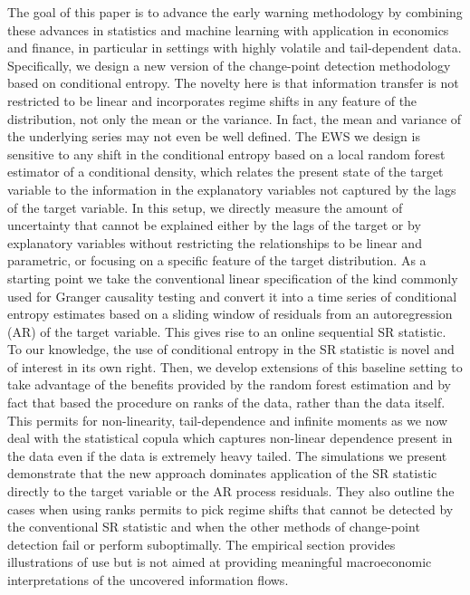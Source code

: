 The goal of this paper is to advance the early warning methodology by combining these advances in statistics and machine learning with application in economics and finance, in particular in settings with highly volatile and tail-dependent data. Specifically, we design a new version of the change-point detection methodology based on conditional entropy. The novelty here is that information transfer is not restricted to be linear and incorporates regime shifts in any feature of the distribution, not only the mean or the variance. In fact, the mean and variance of the underlying series may not even be well defined. The EWS we design is sensitive to any shift in the conditional entropy based on a local random forest estimator of a conditional density, which relates the present state of the target variable to the information in the explanatory variables not captured by the lags of the target variable.  In this setup,  we directly measure the amount of uncertainty that cannot be explained either by the lags of the target or by explanatory variables without restricting the relationships to be linear and parametric, or focusing on a specific feature of the target distribution. 
As a starting point we take the conventional linear specification of the kind commonly used for Granger causality testing and convert it into a time series of conditional entropy estimates based on a sliding window of residuals from an autoregression (AR) of the target variable. This gives rise to an online sequential SR statistic. To our knowledge, the use of conditional entropy in the SR statistic is novel and of interest  in its own right. Then, we develop extensions of this baseline setting to take advantage of the benefits provided by the random forest estimation and by fact that based the procedure on ranks of the data, rather than the data itself. This permits for non-linearity, tail-dependence and infinite moments as we now deal with the statistical copula which captures non-linear dependence present in the data even if the data is extremely heavy tailed. The simulations we present demonstrate that the new approach dominates application of the SR statistic directly to the target variable or the AR process residuals. They also outline the cases when using ranks permits to pick regime shifts that cannot be detected by the conventional SR statistic and when the other methods of change-point detection fail or perform suboptimally. The empirical section provides illustrations of use but is not aimed at providing meaningful macroeconomic interpretations of the uncovered information flows.    

